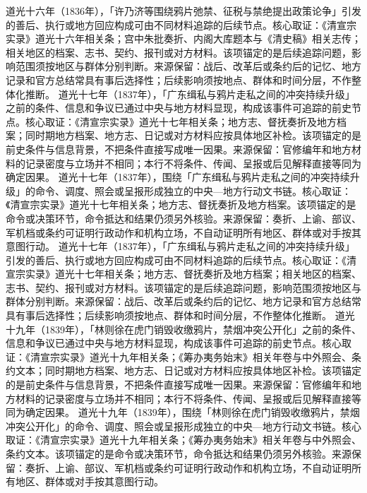 道光十六年（1836年），「许乃济等围绕鸦片弛禁、征税与禁绝提出政策论争」引发的善后、执行或地方回应构成可由不同材料追踪的后续节点。核心取证：《清宣宗实录》道光十六年相关条；宫中朱批奏折、内阁大库题本与《清史稿》相关志传；相关地区的档案、志书、契约、报刊或对方材料。该项锚定的是后续追踪问题，影响范围须按地区与群体分别判断。来源保留：战后、改革后或条约后的记忆、地方记录和官方总结常具有事后选择性；后续影响须按地点、群体和时间分层，不作整体化推断。
道光十七年（1837年），「广东缉私与鸦片走私之间的冲突持续升级」之前的条件、信息和争议已通过中央与地方材料显现，构成该事件可追踪的前史节点。核心取证：《清宣宗实录》道光十七年相关条；地方志、督抚奏折及地方档案；同时期地方档案、地方志、日记或对方材料应按具体地区补检。该项锚定的是前史条件与信息背景，不把条件直接写成唯一因果。来源保留：官修编年和地方材料的记录密度与立场并不相同；本行不将条件、传闻、呈报或后见解释直接等同为确定因果。
道光十七年（1837年），围绕「广东缉私与鸦片走私之间的冲突持续升级」的命令、调度、照会或呈报形成独立的中央—地方行动文书链。核心取证：《清宣宗实录》道光十七年相关条；地方志、督抚奏折及地方档案。该项锚定的是命令或决策环节，命令抵达和结果仍须另外核验。来源保留：奏折、上谕、部议、军机档或条约可证明行政动作和机构立场，不自动证明所有地区、群体或对手按其意图行动。
道光十七年（1837年），「广东缉私与鸦片走私之间的冲突持续升级」引发的善后、执行或地方回应构成可由不同材料追踪的后续节点。核心取证：《清宣宗实录》道光十七年相关条；地方志、督抚奏折及地方档案；相关地区的档案、志书、契约、报刊或对方材料。该项锚定的是后续追踪问题，影响范围须按地区与群体分别判断。来源保留：战后、改革后或条约后的记忆、地方记录和官方总结常具有事后选择性；后续影响须按地点、群体和时间分层，不作整体化推断。
道光十九年（1839年），「林则徐在虎门销毁收缴鸦片，禁烟冲突公开化」之前的条件、信息和争议已通过中央与地方材料显现，构成该事件可追踪的前史节点。核心取证：《清宣宗实录》道光十九年相关条；《筹办夷务始末》相关年卷与中外照会、条约文本；同时期地方档案、地方志、日记或对方材料应按具体地区补检。该项锚定的是前史条件与信息背景，不把条件直接写成唯一因果。来源保留：官修编年和地方材料的记录密度与立场并不相同；本行不将条件、传闻、呈报或后见解释直接等同为确定因果。
道光十九年（1839年），围绕「林则徐在虎门销毁收缴鸦片，禁烟冲突公开化」的命令、调度、照会或呈报形成独立的中央—地方行动文书链。核心取证：《清宣宗实录》道光十九年相关条；《筹办夷务始末》相关年卷与中外照会、条约文本。该项锚定的是命令或决策环节，命令抵达和结果仍须另外核验。来源保留：奏折、上谕、部议、军机档或条约可证明行政动作和机构立场，不自动证明所有地区、群体或对手按其意图行动。
